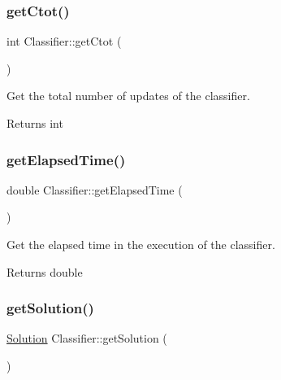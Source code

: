 \mbox{\label{class_classifier_ab80a78cd6a4efc59b16f5b80cd64dc63}} 
\subsubsection{\texorpdfstring{get\+Ctot()}{getCtot()}}
{\footnotesize\ttfamily int Classifier\+::get\+Ctot (\begin{DoxyParamCaption}{ }\end{DoxyParamCaption})\hspace{0.3cm}{\ttfamily [inline]}}



Get the total number of updates of the classifier. 

\begin{DoxyReturn}{Returns}
int 
\end{DoxyReturn}
\mbox{\label{class_classifier_ab47b67b061041193aa3ae2a7856f4980}} 
\subsubsection{\texorpdfstring{get\+Elapsed\+Time()}{getElapsedTime()}}
{\footnotesize\ttfamily double Classifier\+::get\+Elapsed\+Time (\begin{DoxyParamCaption}{ }\end{DoxyParamCaption})\hspace{0.3cm}{\ttfamily [inline]}}



Get the elapsed time in the execution of the classifier. 

\begin{DoxyReturn}{Returns}
double 
\end{DoxyReturn}
\mbox{\label{class_classifier_afd2b54ada10af9f4be1c4d326b180dc7}} 
\subsubsection{\texorpdfstring{get\+Solution()}{getSolution()}}
{\footnotesize\ttfamily \hyperlink{class_solution}{Solution} Classifier\+::get\+Solution (\begin{DoxyParamCaption}{ }\end{DoxyParamCaption})}



